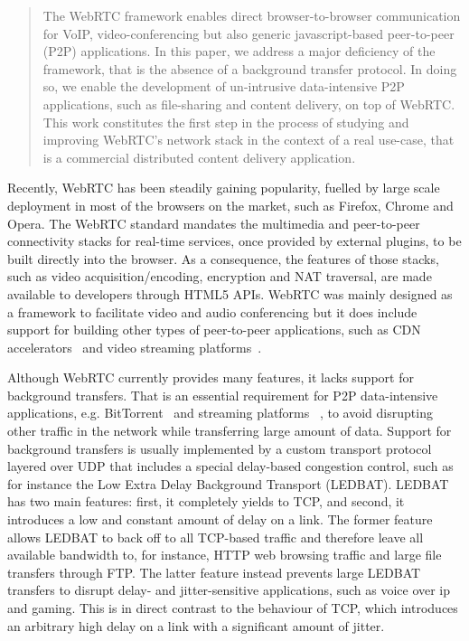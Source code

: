 \documentclass{sig-alternate}
\begin{document}
\begin{abstract}
  The WebRTC framework enables direct browser-to-browser communication for VoIP,
  video-conferencing but also generic javascript-based peer-to-peer (P2P) applications. In
  this
  paper, we address a major deficiency of the framework, that is the absence of a
  background transfer protocol. In doing so, we enable the development of un-intrusive
  data-intensive P2P applications, such as file-sharing and content delivery, on top of
  WebRTC.
This work constitutes the first step in the
  process of studying and improving WebRTC's network stack in the context of a real
  use-case, that is a commercial distributed content delivery application. 
\end{abstract}


Recently, WebRTC has been steadily gaining popularity, fuelled by large scale deployment in
most of the browsers on the market, such as Firefox, Chrome and Opera. The WebRTC standard
mandates the multimedia and peer-to-peer connectivity stacks for real-time services, once
provided by external plugins, to be built directly into the browser. As a consequence, the
features of those stacks, such as video acquisition/encoding, encryption and NAT
traversal, are made available to developers through HTML5 APIs. WebRTC was mainly designed
as a framework to facilitate video and audio conferencing but it does include support for
building other types of peer-to-peer applications, such as CDN
accelerators~\cite{peerCDN} and video streaming platforms~\cite{nurminen2013p2p}.


Although WebRTC currently provides many features, it lacks support for background
transfers. That is an essential requirement for P2P data-intensive applications, e.g.
BitTorrent~\cite{pouwelse2005bittorrent} and streaming platforms ~\cite{smoothcache}, to
avoid disrupting other traffic in the network while transferring large amount of data.
Support for background transfers is usually implemented by a custom transport protocol
layered over UDP that includes a special delay-based congestion control, such as for
instance the Low Extra Delay Background Transport (LEDBAT). LEDBAT has two main features:
first, it completely yields to TCP, and second, it introduces a low and constant amount of
delay on a link. The former feature allows LEDBAT to back off to all TCP-based traffic and
therefore leave all available bandwidth to, for instance, HTTP web browsing traffic and
large file transfers through FTP. The latter feature instead prevents large LEDBAT
transfers to disrupt delay- and jitter-sensitive applications, such as voice over ip and
gaming. This is in direct contrast to the behaviour of TCP, which introduces an arbitrary
high delay on a link with a significant amount of jitter.
\end{document}
